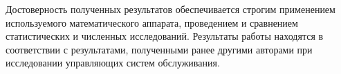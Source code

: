 

{\probation} Достоверность полученных результатов обеспечивается строгим применением используемого математического аппарата, проведением и сравнением статистических и численных исследований. Результаты работы находятся в соответствии с результатами, полученными ранее другими авторами при исследовании управляющих систем обслуживания.

